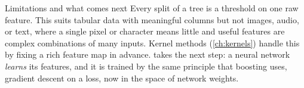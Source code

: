 \begin{notebox}{Limitations and what comes next}
Every split of a tree is a threshold on one raw feature. This suits tabular data with meaningful columns but not images, audio, or text, where a single pixel or character means little and useful features are complex combinations of many inputs. Kernel methods (\cref{ch:kernels}) handle this by fixing a rich feature map in advance.  takes the next step: a neural network \emph{learns} its features, and it is trained by the same principle that boosting uses, gradient descent on a loss, now in the space of network weights.
\end{notebox}
